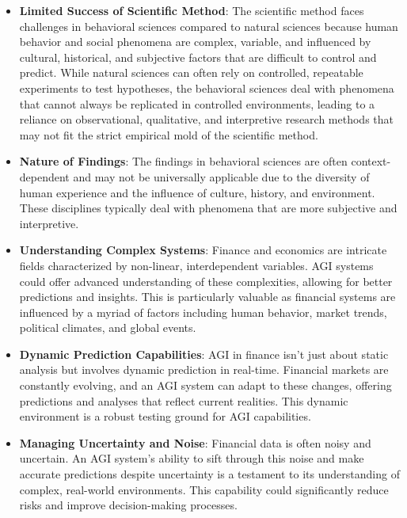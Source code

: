 \documentclass[11pt, reqno]{amsart}
\theoremstyle{definition}
\theoremstyle{remark}
\begin{document}
  \begin{itemize}
    \item \textbf{Limited Success of Scientific Method}: The scientific method
      faces challenges in behavioral sciences compared to natural sciences
      because human behavior and social phenomena are complex, variable, and
      influenced by cultural, historical, and subjective factors that are
      difficult to control and predict. While natural sciences can often rely
      on controlled, repeatable experiments to test hypotheses, the behavioral
      sciences deal with phenomena that cannot always be replicated in
      controlled environments, leading to a reliance on observational,
      qualitative, and interpretive research methods that may not fit the
      strict empirical mold of the scientific method.

    \item \textbf{Nature of Findings}: The findings in behavioral sciences are
      often context-dependent and may not be universally applicable due to the
      diversity of human experience and the influence of culture, history, and
      environment. These disciplines typically deal with phenomena that are
      more subjective and interpretive.

    \item \textbf{Understanding Complex Systems}: Finance and economics are intricate
      fields characterized by non-linear, interdependent variables. AGI systems could
      offer advanced understanding of these complexities, allowing for better
      predictions and insights. This is particularly valuable as financial systems
      are influenced by a myriad of factors including human behavior, market
      trends, political climates, and global events.

    \item \textbf{Dynamic Prediction Capabilities}: AGI in finance isn't just about
      static analysis but involves dynamic prediction in real-time. Financial
      markets are constantly evolving, and an AGI system can adapt to these changes,
      offering predictions and analyses that reflect current realities. This dynamic
      environment is a robust testing ground for AGI capabilities.

    \item \textbf{Managing Uncertainty and Noise}: Financial data is often noisy
      and uncertain. An AGI system's ability to sift through this noise and make
      accurate predictions despite uncertainty is a testament to its
      understanding of complex, real-world environments. This capability could
      significantly reduce risks and improve decision-making processes.


\end{itemize}
\end{document}
